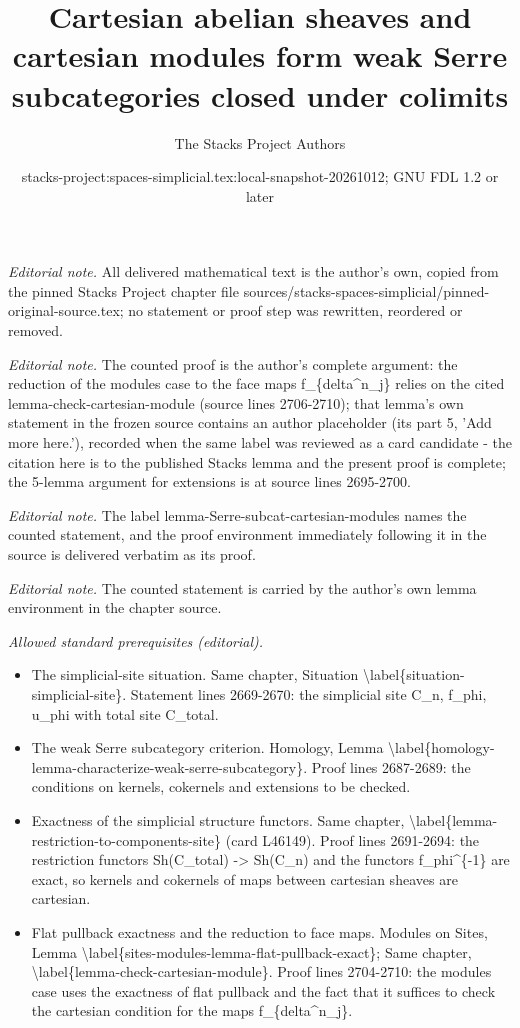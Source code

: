 \documentclass{stacks-project}
\title{Cartesian abelian sheaves and cartesian modules form weak Serre subcategories closed under colimits}
\author{The Stacks Project Authors}
\date{stacks-project:spaces-simplicial.tex:local-snapshot-20261012; GNU FDL 1.2 or later}
\theoremstyle{plain}
\theoremstyle{definition}
\theoremstyle{remark}
\numberwithin{equation}{subsection}
\begin{document}
\maketitle
\noindent\textit{Editorial note.} All delivered mathematical text is the author's own, copied from the pinned Stacks Project chapter file sources/stacks-spaces-simplicial/pinned-original-source.tex; no statement or proof step was rewritten, reordered or removed.\par\medskip
\noindent\textit{Editorial note.} The counted proof is the author's complete argument: the reduction of the modules case to the face maps f\_\{delta\textasciicircum{}n\_j\} relies on the cited lemma-check-cartesian-module (source lines 2706-2710); that lemma's own statement in the frozen source contains an author placeholder (its part 5, 'Add more here.'), recorded when the same label was reviewed as a card candidate - the citation here is to the published Stacks lemma and the present proof is complete; the 5-lemma argument for extensions is at source lines 2695-2700.\par\medskip
\noindent\textit{Editorial note.} The label lemma-Serre-subcat-cartesian-modules names the counted statement, and the proof environment immediately following it in the source is delivered verbatim as its proof.\par\medskip
\noindent\textit{Editorial note.} The counted statement is carried by the author's own lemma environment in the chapter source.\par\medskip
\noindent\textit{Allowed standard prerequisites (editorial).}\begin{itemize}
\item The simplicial-site situation. Same chapter, Situation \textbackslash{}label\{situation-simplicial-site\}. Statement lines 2669-2670: the simplicial site C\_n, f\_phi, u\_phi with total site C\_total.
\item The weak Serre subcategory criterion. Homology, Lemma \textbackslash{}label\{homology-lemma-characterize-weak-serre-subcategory\}. Proof lines 2687-2689: the conditions on kernels, cokernels and extensions to be checked.
\item Exactness of the simplicial structure functors. Same chapter, \textbackslash{}label\{lemma-restriction-to-components-site\} (card L46149). Proof lines 2691-2694: the restriction functors Sh(C\_total) -> Sh(C\_n) and the functors f\_phi\textasciicircum{}\{-1\} are exact, so kernels and cokernels of maps between cartesian sheaves are cartesian.
\item Flat pullback exactness and the reduction to face maps. Modules on Sites, Lemma \textbackslash{}label\{sites-modules-lemma-flat-pullback-exact\}; Same chapter, \textbackslash{}label\{lemma-check-cartesian-module\}. Proof lines 2704-2710: the modules case uses the exactness of flat pullback and the fact that it suffices to check the cartesian condition for the maps f\_\{delta\textasciicircum{}n\_j\}.
\end{itemize}\medskip
\end{document}

